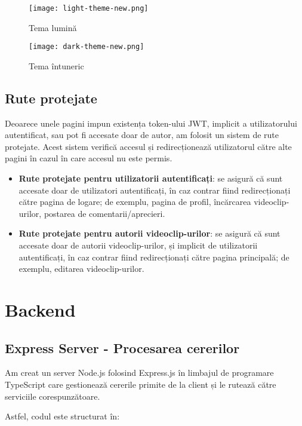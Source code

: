 \begin{figure}[h]
    \centering
    \begin{minipage}{0.49\textwidth}
        \centering
        \texttt{[image: light-theme-new.png]}
        \caption{Tema lumină}
        \label{fig:light-theme}
    \end{minipage}\hfill
    \begin{minipage}{0.49\textwidth}
        \centering
        \texttt{[image: dark-theme-new.png]}
        \caption{Tema întuneric}
        \label{fig:dark-theme}
    \end{minipage}
\end{figure}

\subsection{Rute protejate}
Deoarece unele pagini impun existența token-ului JWT, implicit a utilizatorului autentificat,
sau pot fi accesate doar de autor, am folosit un sistem de rute protejate. Acest sistem
verifică accesul și redirecționează utilizatorul către alte pagini în cazul în care accesul
nu este permis. 
\begin{itemize}
    \item \textbf{Rute protejate pentru utilizatorii autentificați}: se asigură că sunt accesate doar de utilizatori autentificați,
    în caz contrar fiind redirecționați către pagina de logare; de exemplu, pagina de profil,
    încărcarea videoclip-urilor, postarea de comentarii/aprecieri.
    \item \textbf{Rute protejate pentru autorii videoclip-urilor}: se asigură că sunt accesate doar de autorii videoclip-urilor,
    și implicit de utilizatorii autentificați, în caz contrar fiind redirecționați către pagina principală;
    de exemplu, editarea videoclip-urilor.
\end{itemize}

\section{Backend}

\subsection{Express Server - Procesarea cererilor}
Am creat un server Node.js folosind Express.js în limbajul de programare TypeScript care
gestionează cererile primite de la client și le rutează către serviciile corespunzătoare.
\par
Astfel, codul este structurat în:

